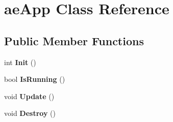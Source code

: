 \hypertarget{classae_app}{}\section{ae\+App Class Reference}
\label{classae_app}
\subsection*{Public Member Functions}
\begin{DoxyCompactItemize}
\item 
int {\bfseries Init} ()\hypertarget{classae_app_a1ec791a1492ce55fddcbac02646652c8}{}\label{classae_app_a1ec791a1492ce55fddcbac02646652c8}

\item 
bool {\bfseries Is\+Running} ()\hypertarget{classae_app_a688edeae06699cf509997caa7700888b}{}\label{classae_app_a688edeae06699cf509997caa7700888b}

\item 
void {\bfseries Update} ()\hypertarget{classae_app_a7a822d98e9d2aa6bfe116c48089cc4f5}{}\label{classae_app_a7a822d98e9d2aa6bfe116c48089cc4f5}

\item 
void {\bfseries Destroy} ()\hypertarget{classae_app_a4474aff034a1d4dfe0e52bb5e2e6e052}{}\label{classae_app_a4474aff034a1d4dfe0e52bb5e2e6e052}

\end{DoxyCompactItemize}

